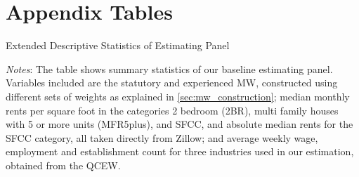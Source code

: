 \section{Appendix Tables}

\begin{table}[h!]
	\caption{Extended Descriptive Statistics of Estimating Panel}
	\label{tab:estimating_panel_stats_long}
	\centering
	
	\begin{minipage}{\textwidth} \footnotesize
		\vspace{3mm} 
		\textit{Notes}: The table shows summary statistics of our baseline estimating panel.
		Variables included are the statutory and experienced MW, constructed using different
		sets of weights as explained in \autoref{sec:mw_construction}; median monthly rents 
		per square foot in the categories 2 bedroom (2BR), multi family houses with 5 or more 
		units (MFR5plus), and SFCC, and absolute median rents for the SFCC category, all taken
		directly from Zillow; and average weekly wage, employment and establishment count 
		for three industries used in our estimation, obtained from the QCEW.
	\end{minipage}
\end{table}

